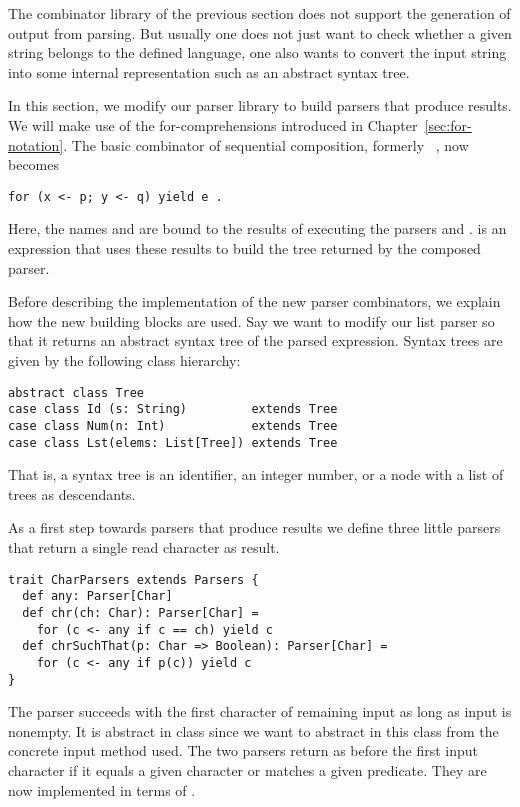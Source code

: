 {{The combinator library of the previous section does not support the
generation of output from parsing. But usually one does not just want
to check whether a given string belongs to the defined language, one
also wants to convert the input string into some internal
representation such as an abstract syntax tree.

In this section, we modify our parser library to build parsers that
produce results. We will make use of the for-comprehensions introduced
in Chapter~\ref{sec:for-notation}.  The basic combinator of sequential
composition, formerly ~, now becomes
\begin{lstlisting}
for (x <- p; y <- q) yield e .
\end{lstlisting}
Here, the names  and  are bound to the results of
executing the parsers  and .  is an expression
that uses these results to build the tree returned by the composed
parser.

Before describing the implementation of the new parser combinators, we
explain how the new building blocks are used. Say we want to modify
our list parser so that it returns an abstract syntax tree of the
parsed expression. Syntax trees are given by the following class hierarchy:
\begin{lstlisting}
abstract class Tree
case class Id (s: String)         extends Tree
case class Num(n: Int)            extends Tree
case class Lst(elems: List[Tree]) extends Tree
\end{lstlisting}
That is, a syntax tree is an identifier, an integer number, or a
 node with a list of trees as descendants.

As a first step towards parsers that produce results we define three
little parsers that return a single read character as result.
\begin{lstlisting}
trait CharParsers extends Parsers {
  def any: Parser[Char]
  def chr(ch: Char): Parser[Char] =
    for (c <- any if c == ch) yield c
  def chrSuchThat(p: Char => Boolean): Parser[Char] =
    for (c <- any if p(c)) yield c
}
\end{lstlisting}
The  parser succeeds with the first character of remaining
input as long as input is nonempty. It is abstract in class
 since we want to abstract in this class from the
concrete input method used.  The two  parsers return as before
the first input character if it equals a given character or matches a
given predicate. They are now implemented in terms of .

}}
